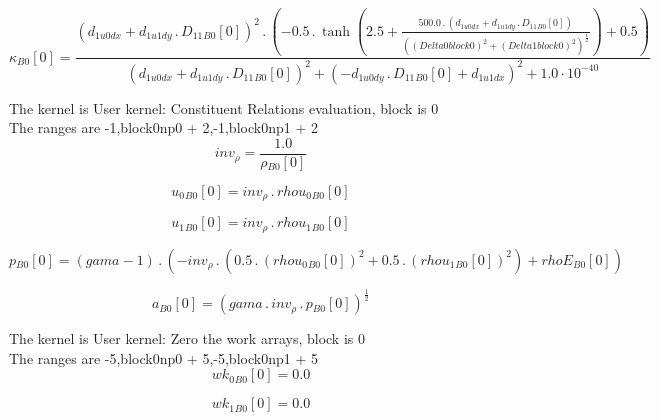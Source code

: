 \documentclass{article}
\begin{document}
\begin{dmath}{\kappa{_{B0}}}[{0}] = \frac{\left(d_{1 u0 dx} + d_{1 u1 dy} \,.\, {D_{11}{_{B0}}}[{0}] \right)^{2} \,.\, \left(- 0.5 \,.\, \tanh{\left (2.5 + \frac{500.0 \,.\, \left(d_{1 u0 dx} + d_{1 u1 dy} \,.\, 
{D_{11}{_{B0}}}[{0}]\right)}{\left(\left(Delta0block0 \right)^{2} + \left(Delta1block0 \right)^{2} \right)^{\frac{1}{2}}} \right )} + 0.5\right)}{\left(d_{1 u0 dx} + d_{1 u1 dy} \,.\, {D_{11}{_{B0}}}[{0}] \right)^{2} + \left(- d_{1 u0 dy} \,.\, 
{D_{11}{_{B0}}}[{0}] + d_{1 u1 dx} \right)^{2} + 1.0 \cdot 10^{-40}}\end{dmath}

\noindent The kernel is User kernel: Constituent Relations evaluation, block is 0\\\noindent The ranges are -1,block0np0 + 2,-1,block0np1 + 2\\\begin{dmath}inv_{\rho} = \frac{1.0}{{\rho{_{B0}}}[{0}]}\end{dmath}

\begin{dmath}{u_{0}{_{B0}}}[{0}] = inv_{\rho} \,.\, {rhou_{0}{_{B0}}}[{0}]\end{dmath}

\begin{dmath}{u_{1}{_{B0}}}[{0}] = inv_{\rho} \,.\, {rhou_{1}{_{B0}}}[{0}]\end{dmath}

\begin{dmath}{p{_{B0}}}[{0}] = \left(gama - 1\right) \,.\, \left(- inv_{\rho} \,.\, \left(0.5 \,.\, \left({rhou_{0}{_{B0}}}[{0}] \right)^{2} + 0.5 \,.\, \left({rhou_{1}{_{B0}}}[{0}] \right)^{2}\right) + {rhoE{_{B0}}}[{0}]\right)\end{dmath}

\begin{dmath}{a{_{B0}}}[{0}] = \left(gama \,.\, inv_{\rho} \,.\, {p{_{B0}}}[{0}] \right)^{\frac{1}{2}}\end{dmath}

\noindent The kernel is User kernel: Zero the work arrays, block is 0\\\noindent The ranges are -5,block0np0 + 5,-5,block0np1 + 5\\\begin{dmath}{wk_{0}{_{B0}}}[{0}] = 0.0\end{dmath}

\begin{dmath}{wk_{1}{_{B0}}}[{0}] = 0.0\end{dmath}
\end{document}

